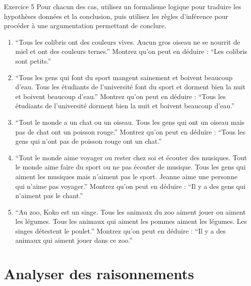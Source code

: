 \documentclass[a4paper,11pt]{article}
\begin{document}
\begin{exercisebox}{Exercice 5}
Pour chacun des cas, utilisez un formalisme logique pour traduire les hypothèses données et la conclusion, puis utilisez les règles d'inférence pour procéder à une argumentation permettant de conclure.

\begin{enumerate}
    \item ``Tous les colibris ont des couleurs vives. Aucun gros oiseau ne se nourrit de miel et ont des couleurs ternes.'' Montrez qu'on peut en déduire : ``Les colibris sont petits.''
    
    \item ``Tous les gens qui font du sport mangent sainement et boivent beaucoup d'eau. Tous les étudiants de l'université font du sport et dorment bien la nuit et boivent beaucoup d'eau.'' Montrez qu'on peut en déduire : ``Tous les étudiants de l'université dorment bien la nuit et boivent beaucoup d'eau.''
    
    \item ``Tout le monde a un chat ou un oiseau. Tous les gens qui ont un oiseau mais pas de chat ont un poisson rouge.'' Montrez qu'on peut en déduire : ``Tous les gens qui n'ont pas de poisson rouge ont un chat.''
    
    \item ``Tout le monde aime voyager ou rester chez soi et écouter des musiques. Tout le monde aime faire du sport ou ne pas écouter de musique. Tous les gens qui aiment les musiques mais n'aiment pas le sport. Jeanne aime une personne qui n'aime pas voyager.'' Montrez qu'on peut en déduire : ``Il y a des gens qui n'aiment pas le chant.''
    
    \item ``Au zoo, Koko est un singe. Tous les animaux du zoo aiment jouer ou aiment les légumes. Tous les animaux qui aiment les pommes aiment les légumes. Les singes détestent le poulet.'' Montrez qu'on peut en déduire : ``Il y a des animaux qui aiment jouer dans ce zoo.''
\end{enumerate}
\end{exercisebox}

\section{Analyser des raisonnements}
\end{document}
